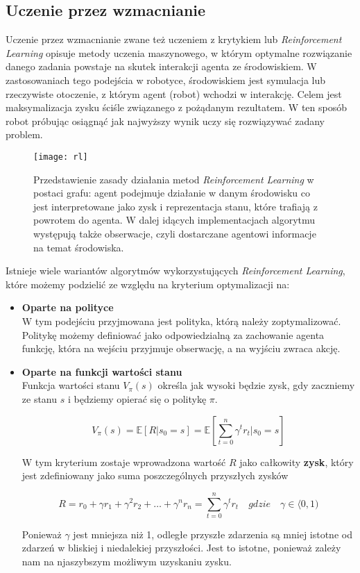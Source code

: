 \documentclass[12pt]{article}
\begin{document}
\subsection{Uczenie przez wzmacnianie}
Uczenie przez wzmacnianie zwane też uczeniem z krytykiem lub \emph{Reinforcement Learning} opisuje metody uczenia maszynowego, w którym optymalne rozwiązanie danego zadania powstaje na skutek interakcji agenta ze środowiskiem. W zastosowaniach tego podejścia w robotyce, środowiskiem jest symulacja lub rzeczywiste otoczenie, z którym agent (robot) wchodzi w interakcję. Celem jest maksymalizacja zysku ściśle związanego z pożądanym rezultatem. W ten sposób robot próbując osiągnąć jak najwyższy wynik uczy się rozwiązywać zadany problem.

\begin{figure}[h]
\centering
\texttt{[image: rl]}
\caption{Przedstawienie zasady działania metod \emph{Reinforcement Learning} w postaci grafu: agent podejmuje działanie w danym środowisku co jest interpretowane jako zysk i reprezentacja stanu, które trafiają z powrotem do agenta. W dalej idących implementacjach algorytmu występują także obserwacje, czyli dostarczane agentowi informacje na temat środowiska.}
\end{figure}

Istnieje wiele wariantów algorytmów wykorzystujących \emph{Reinforcement Learning}, które możemy podzielić ze względu na kryterium optymalizacji na:
\begin{itemize}
\item \textbf{Oparte na polityce} \\
W tym podejściu przyjmowana jest polityka, którą należy zoptymalizować. Politykę możemy definiować jako odpowiedzialną za zachowanie agenta funkcję, która na wejściu przyjmuje obserwację, a na wyjściu zwraca akcję.  

\item \textbf{Oparte na funkcji wartości stanu} \\
Funkcja wartości stanu $V_{\pi}(s)$ określa jak wysoki będzie zysk, gdy zaczniemy ze stanu $s$ i będziemy opierać się o politykę $\pi$. 

\[V_{\pi}(s) = \mathbb{E}[R | s_{0}=s] = \mathbb{E} \left[\sum_{t=0}^n \gamma^t r_{t} | s_{0}=s \right]\]

W tym kryterium zostaje wprowadzona wartość $R$ jako całkowity \textbf{zysk}, który jest zdefiniowany jako suma poszczególnych przyszłych zysków

\[R = r_{0} + \gamma r_{1} + \gamma^2 r_{2} + \ldots + \gamma^n r_{n} = \sum_{t=0}^n \gamma^t r_{t} \quad gdzie \quad \gamma \in \langle 0, 1)\]

Ponieważ $\gamma$ jest mniejsza niż 1, odległe przyszłe zdarzenia są mniej istotne od zdarzeń w bliskiej i niedalekiej przyszłości. Jest to istotne, ponieważ zależy nam na njaszybszym możliwym uzyskaniu zysku.
\end{itemize}
\end{document}
